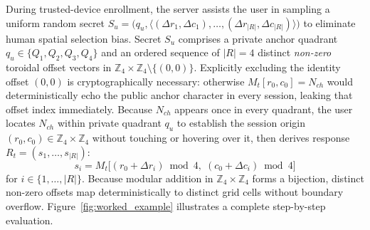 During trusted-device enrollment, the server assists the user in sampling a uniform random secret $S_u = \big(q_u, \langle (\Delta r_1, \Delta c_1), \dots, (\Delta r_{|R|}, \Delta c_{|R|}) \rangle\big)$ to eliminate human spatial selection bias. Secret $S_u$ comprises a private anchor quadrant $q_u \in \{Q_1, Q_2, Q_3, Q_4\}$ and an ordered sequence of $|R| = 4$ distinct \emph{non-zero} toroidal offset vectors in $\mathbb{Z}_4 \times \mathbb{Z}_4 \setminus \{(0,0)\}$. Explicitly excluding the identity offset $(0,0)$ is cryptographically necessary: otherwise $M_t[r_0, c_0] = N_{ch}$ would deterministically echo the public anchor character in every session, leaking that offset index immediately. Because $N_{ch}$ appears once in every quadrant, the user locates $N_{ch}$ within private quadrant $q_u$ to establish the session origin $(r_0, c_0) \in \mathbb{Z}_4 \times \mathbb{Z}_4$ without touching or hovering over it, then derives response $R_t = (s_1, \dots, s_{|R|})$:
\begin{equation}
s_i = M_t\big[(r_0 + \Delta r_i) \bmod 4,\; (c_0 + \Delta c_i) \bmod 4\big]
\label{eq:toroidal}
\end{equation}
for $i \in \{1, \dots, |R|\}$. Because modular addition in $\mathbb{Z}_4 \times \mathbb{Z}_4$ forms a bijection, distinct non-zero offsets map deterministically to distinct grid cells without boundary overflow. Figure~\ref{fig:worked_example} illustrates a complete step-by-step evaluation.

